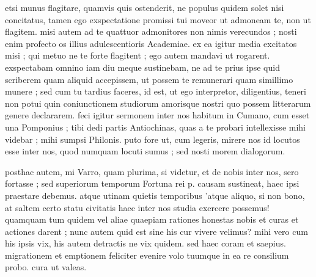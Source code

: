 


 etsi munus flagitare, quamvis quis ostenderit, ne populus quidem solet nisi concitatus, tamen ego exspectatione promissi tui moveor ut admoneam te, non ut flagitem. misi autem ad te quattuor admonitores non nimis verecundos ; nosti enim profecto os illius adulescentioris Academiae. ex ea igitur media excitatos misi ; qui metuo ne te forte flagitent ; ego autem mandavi ut rogarent. exspectabam omnino iam diu meque sustinebam, ne ad te prius ipse quid scriberem quam aliquid accepissem, ut possem te remunerari quam simillimo munere ; sed cum tu tardius faceres, id est, ut ego interpretor, diligentius, teneri non potui quin coniunctionem studiorum amorisque nostri quo possem litterarum genere declararem. feci igitur sermonem inter nos habitum in Cumano, cum esset una Pomponius ; tibi dedi partis Antiochinas, quas a te probari intellexisse mihi videbar ; mihi sumpsi Philonis. puto fore ut, cum legeris, mirere nos id locutos esse inter nos, quod numquam locuti sumus ; sed nosti morem dialogorum.

 posthac autem, mi Varro, quam plurima, si videtur, et de nobis inter nos, sero fortasse ; sed superiorum temporum Fortuna rei p. causam sustineat, haec ipsi praestare debemus. atque utinam quietis temporibus 'atque aliquo, si non bono, at saltem certo statu civitatis haec inter nos studia exercere possemus! quamquam tum quidem vel aliae quaepiam rationes honestas nobis et curas et actiones darent ; nunc autem quid est sine his cur vivere velimus? mihi vero cum his ipsis vix, his autem detractis ne vix quidem. sed haec coram et saepius. migrationem et emptionem feliciter evenire volo tuumque in ea re consilium probo. cura ut valeas.
